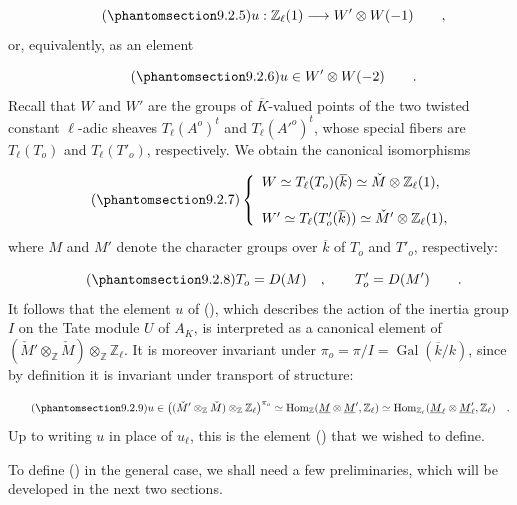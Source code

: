 \begin{equation}\tag{\SGARefTarget{sga7.sga7i.eix.n9-2-5}{9.2.5}}
u:\mathbb{Z}_{\ell}(1)\longrightarrow W'\otimes W(-1)
 \qquad ,
\end{equation}
or, equivalently, as an element

\begin{equation}\tag{\SGARefTarget{sga7.sga7i.eix.n9-2-6}{9.2.6}}
u\in W'\otimes W(-2) \qquad .
\end{equation}
Recall that $W$ and $W'$ are the groups of $\overline K$-valued
points of the two twisted constant $\ell$-adic sheaves
$T_{\ell}(A^o)^t$ and $T_{\ell}({A'}^o)^t$, whose special fibers are
$T_{\ell}(T_o)$ and $T_{\ell}(T'_o)$, respectively. We obtain the
canonical isomorphisms

\begin{equation}\tag{\SGARefTarget{sga7.sga7i.eix.n9-2-7}{9.2.7}}
\left\{
\begin{array}{l}
W\simeq T_{\ell}(T_o)(\overline k)
 \simeq\check M\otimes\mathbb{Z}_{\ell}(1),\\[3ex]
W'\simeq T_{\ell}(T'_o(\overline k))
 \simeq\check M'\otimes\mathbb{Z}_{\ell}(1),
\end{array}
\right.
\end{equation}
where $M$ and $M'$ denote the character groups over $\overline k$
of $T_o$ and $T'_o$, respectively:

\begin{equation}\tag{\SGARefTarget{sga7.sga7i.eix.n9-2-8}{9.2.8}}
T_o=D(M) \quad , \qquad T'_o=D(M') \qquad .
\end{equation}
It follows that the element $u$ of (), which describes the
action of the inertia group $I$ on the Tate module $U$ of $A_K$, is
interpreted as a canonical element of
$(\check M'\otimes_{\mathbb{Z}}\check M)
 \otimes_{\mathbb{Z}}\mathbb{Z}_{\ell}$. It is moreover invariant
under $\pi_o=\pi/I=\operatorname{Gal}(\overline k/k)$, since by
definition it is invariant under transport of structure:

\begin{equation}\tag{\SGARefTarget{sga7.sga7i.eix.n9-2-9}{9.2.9}}
u\in
\bigl((\check M'\otimes_{\mathbb{Z}}\check M)
 \otimes_{\mathbb{Z}}\mathbb{Z}_{\ell}\bigr)^{\pi_o}
\simeq
\operatorname{Hom}_{\mathbb{Z}}
 (\underline M\otimes\underline M',\mathbb{Z}_{\ell})
\simeq
\operatorname{Hom}_{\mathbb{Z}_{\ell}}
 (\underline M_{\ell}\otimes\underline M'_{\ell},
  \mathbb{Z}_{\ell}) \quad .
\end{equation}
Up to writing $u$ in place of $u_{\ell}$, this is the element
() that we wished to define.

To define () in the general case, we shall need a few
preliminaries, which will be developed in the next two sections.
